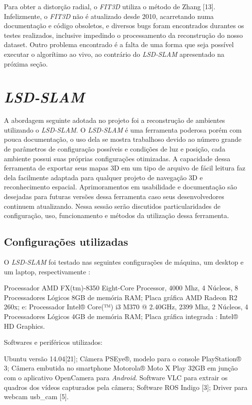Para obter a distorção radial, o \textit{FIT3D} utiliza o método de Zhang [13]. Infelizmente, o \textit{FIT3D} não é atualizado desde 2010, acarretando numa documentação e código obsoletos, e diversos bugs foram encontrados durantes os testes realizados, inclusive impedindo o processamento da reconstrução do nosso dataset. Outro problema encontrado é a falta de uma forma que seja possível executar o algorítimo ao vivo, ao contrário do \textit{LSD-SLAM} apresentado na próxima seção.


\section{\textit{LSD-SLAM}}

A abordagem seguinte adotada no projeto foi a reconstrução de ambientes utilizando o \textit{LSD-SLAM}. 	O \textit{LSD-SLAM} é uma ferramenta poderosa porém com pouca documentação, o uso dela se mostra trabalhoso devido ao número grande de parâmetros de configuração possíveis e condições de luz e posição, cada ambiente possui suas próprias configurações otimizadas. A capacidade dessa ferramenta de exportar seus mapas 3D em um tipo de arquivo de fácil leitura faz dela facilmente adaptada para qualquer projeto de navegação 3D e reconhecimento espacial. Aprimoramentos em usabilidade e documentação são desejadas para futuras versões dessa ferramenta caso seus desenvolvedores continuem atualizando. Nessa sessão serão discutidos particularidades de configuração, uso, funcionamento e métodos da utilização dessa ferramenta.

\subsection{Configurações utilizadas}

O \textit{LSD-SLAM} foi testado nas seguintes configurações de máquina, um desktop e um laptop, respectivamente :


Processador	AMD FX(tm)-8350 Eight-Core Processor, 4000 Mhz, 4 Núcleos, 8 Processadores Lógicos
8GB de memória RAM;
Placa gráfica AMD Radeon R2 260x;
e:
Processador Intel® Core(™) i3 M370 @ 2.40GHz, 2399 Mhz, 2 Núcleos, 4 Processadores Lógicos
4GB de memória RAM;
Placa gráfica integrada : Intel® HD Graphics.

Softwares e periféricos utilizados:

Ubuntu versão 14.04[21];
Câmera PSEye®, modelo para o console PlayStation® 3;
Câmera embutida no smartphone Motorola® Moto X Play 32GB em junção com o aplicativo OpenCamera para \textit{Android}.
Software VLC para extrair os quadros dos vídeos capturados pela câmera;
Software ROS Indigo [3];
Driver para webcam usb\_cam [5].

